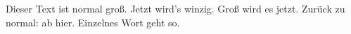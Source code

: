 Dieser Text ist normal groß. 
Jetzt wird's \tiny winzig. 
Groß wird es \huge jetzt. 
Zurück zu normal: \normalsize 
ab hier. Einzelnes {\tiny Wort}
geht so.